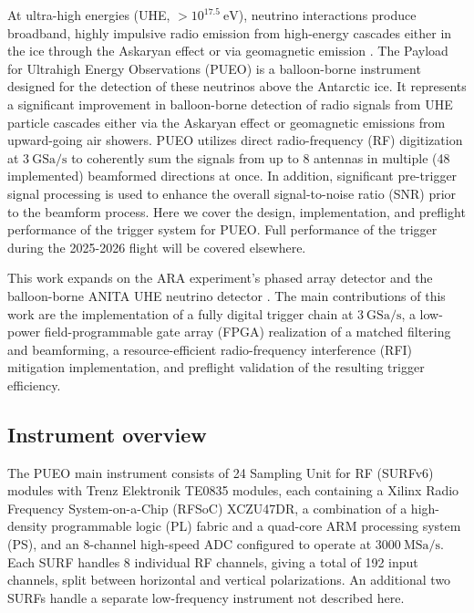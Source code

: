 \documentclass{IEEEtran}
\begin{document}
At ultra-high energies (UHE, $>10^{17.5}~\textrm{eV}$), neutrino interactions produce
broadband, highly impulsive radio emission from high-energy cascades either in
the ice through the Askaryan effect \cite{PhysRevLett.99.171101} or via
geomagnetic emission \cite{PhysRevLett.116.141103}. The Payload for Ultrahigh
Energy Observations (PUEO) \cite{Abarr_2021} is a balloon-borne instrument designed for the detection of these neutrinos above the Antarctic ice. It represents a
significant improvement in balloon-borne detection of radio signals from UHE particle cascades either via the Askaryan effect or
geomagnetic emissions from upward-going air showers. PUEO utilizes direct 
radio-frequency (RF) digitization at $3~\textrm{GSa/s}$ to coherently sum the
signals from up to 8 antennas in multiple (48 implemented) beamformed
directions at once. In addition, significant pre-trigger signal processing is
used to enhance the overall signal-to-noise ratio (SNR) prior to the
beamform process. Here we cover the design, implementation, and preflight
performance of the trigger system for PUEO. Full performance of the trigger
during the 2025-2026 flight will be covered elsewhere.

This work expands on the ARA experiment's phased array detector \cite{ALLISON2019112} 
and the balloon-borne ANITA UHE neutrino detector \cite{PhysRevD.99.122001}. The main
contributions of this work are the implementation of a fully digital trigger
chain at $3~\textrm{GSa/s}$, a low-power field-programmable gate array (FPGA) realization of a matched filtering and
beamforming, a resource-efficient radio-frequency interference (RFI) mitigation
implementation, and preflight validation of the resulting trigger efficiency.

\subsection{Instrument overview}

The PUEO main instrument consists of 24 Sampling Unit for RF (SURFv6) modules
with Trenz Elektronik TE0835 modules, each containing a Xilinx Radio Frequency 
System-on-a-Chip (RFSoC) XCZU47DR, a combination of a high-density programmable logic (PL) fabric and a quad-core ARM processing system (PS),
and an 8-channel high-speed ADC configured to operate at $3000~\textrm{MSa/s}$.
Each SURF handles 8 individual RF channels, giving a total of 192 input channels, 
split between horizontal and vertical polarizations. An additional two SURFs handle a
separate low-frequency instrument not described here.
\end{document}
